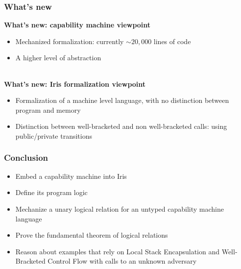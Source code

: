 \documentclass{beamer}
\begin{document}

\begin{frame}
\frametitle{What's new}

\textbf{What's new: capability machine viewpoint}

\begin{itemize}
	\item Mechanized formalization: currently $\sim 20,000$ lines of code
	\item A higher level of abstraction
\end{itemize}

~\\[1em]
\textbf{What's new: Iris formalization viewpoint}
\begin{itemize}
	\item Formalization of a machine level language, with no distinction between program and memory
	\item Distinction between  well-bracketed and non well-bracketed calls: using public/private transitions
\end{itemize}

\end{frame}


\begin{frame}
\frametitle{Conclusion}

\begin{itemize}
	\item Embed a capability machine into Iris
	\item Define its program logic 
	\item Mechanize a unary logical relation for an untyped capability machine language
	\item Prove the fundamental theorem of logical relations
	\item Reason about examples that rely on Local Stack Encapsulation and Well-Bracketed Control Flow with calls to an unknown adversary
\end{itemize}

\end{frame}
\end{document}
